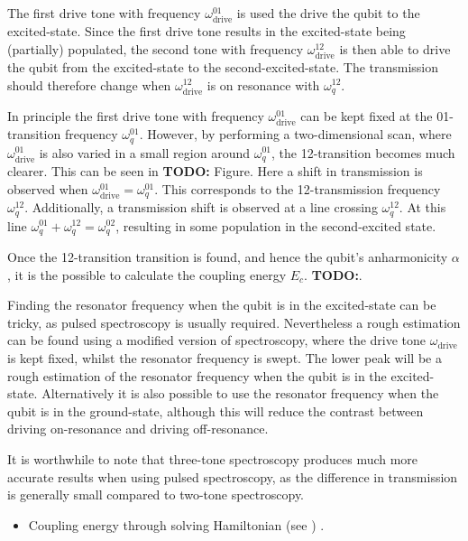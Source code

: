         The first drive tone with frequency $\omega_\text{drive}^{01}$ is used the drive the qubit to the excited-state. Since the first drive tone results in the excited-state being (partially) populated, the second tone with frequency $\omega_\text{drive}^{12}$ is then able to drive the qubit from the excited-state to the second-excited-state. The transmission should therefore change when $\omega_\text{drive}^{12}$ is on resonance with $\omega_q^{12}$.

        In principle the first drive tone with frequency $\omega_\text{drive}^{01}$ can be kept fixed at the 01-transition frequency $\omega_q^{01}$. However, by performing a two-dimensional scan, where $\omega_\text{drive}^{01}$ is also varied in a small region around $\omega_q^{01}$, the 12-transition becomes much clearer. This can be seen in \textbf{TODO:} Figure. Here a shift in transmission is observed when $\omega_\text{drive}^{01} = \omega_q^{01}$. This corresponds to the 12-transmission frequency $\omega_q^{12}$. Additionally, a transmission shift is observed at a line crossing $\omega_q^{12}$. At this line $\omega_q^{01} + \omega_q^{12} = \omega_q^{02}$, resulting in some population in the second-excited state.

        Once the 12-transition transition is found, and hence the qubit's anharmonicity $\alpha$, it is the possible to calculate the coupling energy $E_c$. \textbf{TODO:}.

        Finding the resonator frequency when the qubit is in the excited-state can be tricky, as pulsed spectroscopy is usually required. Nevertheless a rough estimation can be found using a modified version of spectroscopy, where the drive tone $\omega_\text{drive}$ is kept fixed, whilst the resonator frequency is swept. The lower peak will be a rough estimation of the resonator frequency when the qubit is in the excited-state. Alternatively it is also possible to use the resonator frequency when the qubit is in the ground-state, although this will reduce the contrast between driving on-resonance and driving off-resonance.

        It is worthwhile to note that three-tone spectroscopy produces much more accurate results when using pulsed spectroscopy, as the difference in transmission is generally small compared to two-tone spectroscopy.


        \begin{itemize}
           \item Coupling energy through solving Hamiltonian (see \cite{Reed}) .
        \end{itemize}

